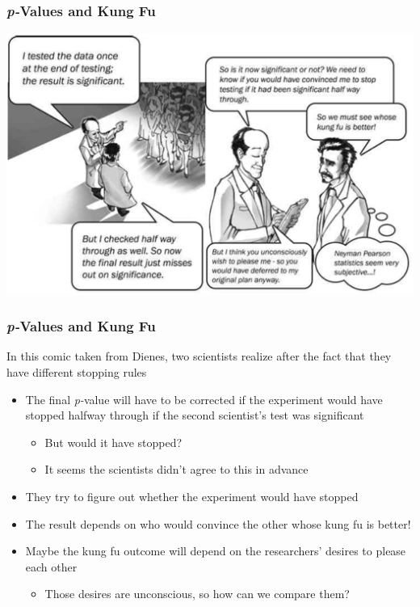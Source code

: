 \documentclass[10pt, block=fill]{beamer}
\begin{document}
\begin{frame}
   \frametitle{\textit{p-}Values and Kung Fu}
   
   \begin{center}
       \includegraphics[width=1.0\linewidth]{figures/kung_fu_cartoon.png}
   \end{center}
    
\end{frame}


\begin{frame}
   \frametitle{\textit{p-}Values and Kung Fu}
   
   In this comic taken from Dienes, two scientists realize after the fact that they have different stopping rules
   \begin{itemize}
       \item The final \textit{p-}value will have to be corrected if the experiment would have stopped halfway through if the second scientist's test was significant
       \begin{itemize}
           \item But would it have stopped?
           \item It seems the scientists didn't agree to this in advance
       \end{itemize}
       \item They try to figure out whether the experiment would have stopped
       \item The result depends on who would convince the other whose kung fu is better!
       \item Maybe the kung fu outcome will depend on the researchers' desires to please each other
       \begin{itemize}
           \item Those desires are unconscious, so how can we compare them?
       \end{itemize}
   \end{itemize}
    
\end{frame}
\end{document}
